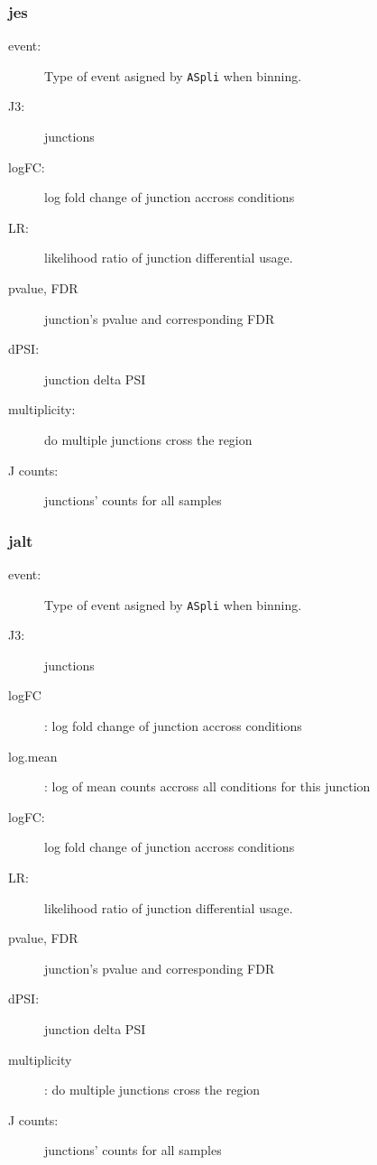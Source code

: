 \documentclass{article}
\begin{document}
\subsubsection*{jes}
  \begin{description}
  \item [event:] Type of event asigned by \texttt{ASpli} when binning. 
   \item [J3:] junctions
   \item [logFC:] log fold change of junction accross conditions
   \item [LR:] likelihood ratio of junction differential usage.
   \item [pvalue, FDR] junction's pvalue and corresponding FDR 
    \item [dPSI:] junction delta PSI
   \item [multiplicity:] do multiple junctions cross the region
   \item [J counts:] junctions' counts for all samples
\end{description}      
  
\subsubsection*{jalt}

  \begin{description}
   \item [event:] Type of event asigned by \texttt{ASpli} when binning. 
   \item [J3:] junctions
   \item [logFC]: log fold change of junction accross conditions
   \item [log.mean]: log of mean counts accross all conditions for this junction
   \item [logFC:] log fold change of junction accross conditions
   \item [LR:] likelihood ratio of junction differential usage.
   \item [pvalue, FDR] junction's pvalue and corresponding FDR 
   \item [dPSI:] junction delta PSI
   \item [multiplicity]: do multiple junctions cross the region
   \item [J counts:] junctions' counts for all samples
\end{description}      



\end{document}
